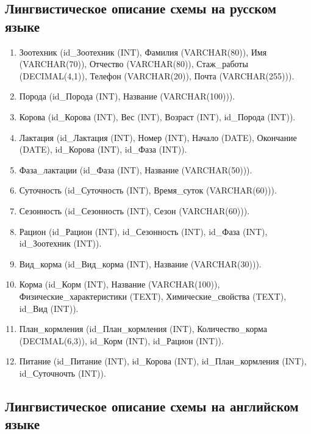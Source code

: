 
\subsection{Лингвистическое описание схемы на русском языке}
\begin{enumerate}
    \item Зоотехник (id\_Зоотехник (INT), Фамилия (VARCHAR(80)), Имя (VARCHAR(70)), Отчество (VARCHAR(80)), Стаж\_работы (DECIMAL(4,1)), Телефон (VARCHAR(20)), Почта (VARCHAR(255))).
    \item Порода (id\_Порода (INT), Название (VARCHAR(100))).
    \item Корова (id\_Корова (INT), Вес (INT), Возраст (INT), id\_Порода (INT)).
    \item Лактация (id\_Лактация (INT), Номер (INT), Начало (DATE), Окончание (DATE), id\_Корова (INT), id\_Фаза (INT)).
    \item Фаза\_лактации (id\_Фаза (INT), Название (VARCHAR(50))).
    \item Суточность (id\_Суточность (INT), Время\_суток (VARCHAR(60))).
    \item Сезонность (id\_Сезонность (INT), Сезон (VARCHAR(60))).
    \item Рацион (id\_Рацион (INT), id\_Сезонность (INT), id\_Фаза (INT), id\_Зоотехник (INT)).
    \item Вид\_корма (id\_Вид\_корма (INT), Название (VARCHAR(30))).
    \item Корма (id\_Корм (INT), Название (VARCHAR(100)), Физические\_характеристики (TEXT), Химические\_свойства (TEXT), id\_Вид (INT)).
    \item План\_кормления (id\_План\_кормления (INT), Количество\_корма (DECIMAL(6,3)), id\_Корм (INT), id\_Рацион (INT)).
    \item Питание (id\_Питание (INT), id\_Корова (INT), id\_План\_кормления (INT), id\_Суточночть (INT)).
\end{enumerate}

\subsection{Лингвистическое описание схемы на английском языке}


